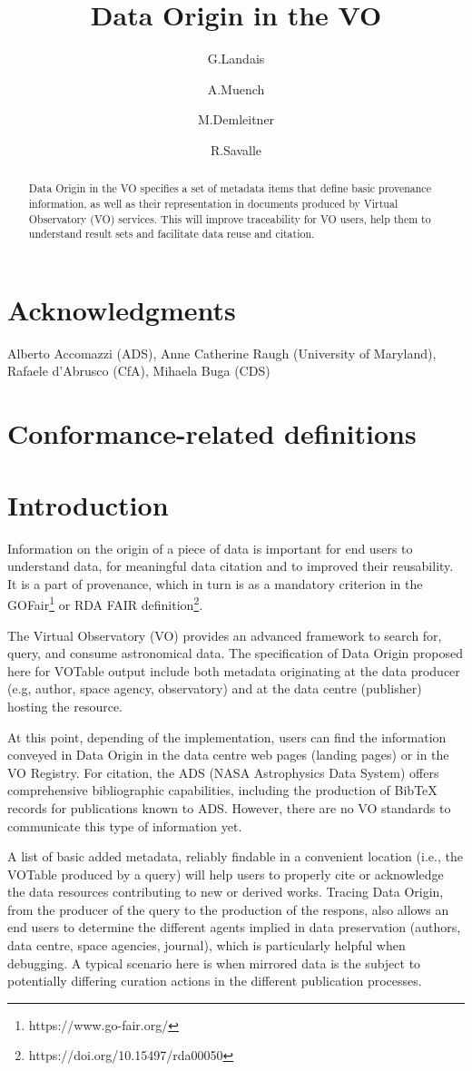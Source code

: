 \documentclass[11pt,a4paper]{ivoa}
\title{Data Origin in the VO}
\author{G.Landais}
\author{A.Muench}
\author{M.Demleitner}
\author{R.Savalle}
\begin{document}
\begin{abstract}
Data Origin in the VO specifies a set of metadata items that define basic
provenance information, as well as their representation in documents produced
by Virtual Observatory (VO) services.  This will improve traceability for VO
users, help them to understand result sets and facilitate data reuse and citation.

\end{abstract}


\section*{Acknowledgments}
Alberto Accomazzi (ADS), Anne Catherine Raugh (University of Maryland), Rafaele d'Abrusco (CfA), Mihaela Buga (CDS)

\section*{Conformance-related definitions}


\section{Introduction}

Information on the origin of a piece of data is important for end users to understand data, for meaningful data citation and to improved their reusability.  It is a part of provenance, which in turn is as a mandatory criterion in the GOFair\footnote{https://www.go-fair.org/} or RDA FAIR definition\footnote{https://doi.org/10.15497/rda00050}.

The Virtual Observatory (VO) provides an advanced framework to search for, query, and consume astronomical data.  The specification of Data Origin proposed here for VOTable output include both metadata originating at the data producer (e.g, author, space agency, observatory) and at the data centre (publisher) hosting the resource.

At this point, depending of the implementation, users can find the information conveyed in Data Origin in the data centre web pages (landing pages) or in the VO Registry.  For citation, the ADS (NASA Astrophysics Data System) offers comprehensive bibliographic capabilities, including the production of BibTeX records for publications known to ADS.  However, there are no VO standards to communicate this type of information yet.

A list of basic added metadata, reliably findable in a convenient location (i.e.,
the VOTable produced by a query) will help users to properly cite or
acknowledge the data resources contributing to new or derived works.
Tracing Data Origin, from the producer of the query to the production of the respons, also allows an end users to determine the different agents implied in data preservation (authors, data centre, space agencies, journal), which is particularly helpful when debugging.  A typical scenario here is when mirrored data is the subject to potentially differing curation actions in the different publication processes.
\end{document}
